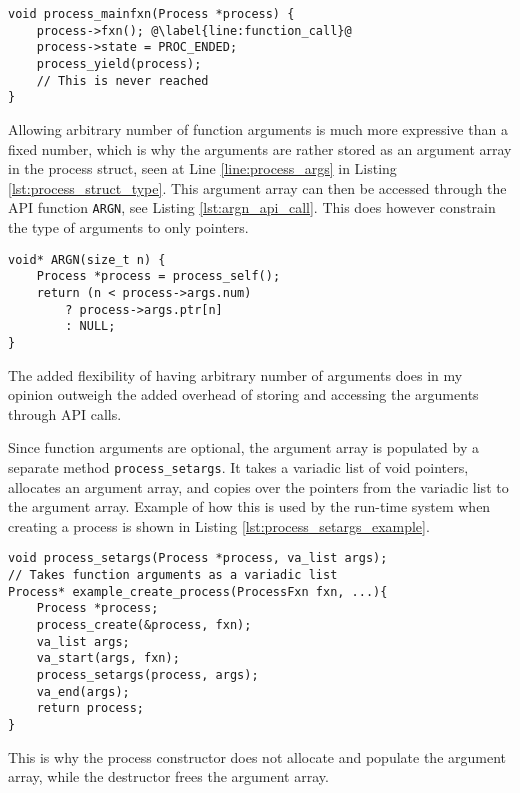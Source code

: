 \begin{lstlisting}[style={CustomC},caption={Process main function},label={lst:process_main_function}]
void process_mainfxn(Process *process) {
    process->fxn(); @\label{line:function_call}@
    process->state = PROC_ENDED;
    process_yield(process);
    // This is never reached
}
\end{lstlisting}

Allowing arbitrary number of function arguments is much more expressive than a fixed number, which is why the arguments are rather stored as an argument array in the process struct, seen at Line \ref{line:process_args} in Listing \ref{lst:process_struct_type}. This argument array can then be accessed through the API function \texttt{ARGN}, see Listing \ref{lst:argn_api_call}. This does however constrain the type of arguments to only pointers. 

\begin{lstlisting}[style={CustomC},caption={\texttt{ARGN} API function},label={lst:argn_api_call}]
void* ARGN(size_t n) {
    Process *process = process_self();
    return (n < process->args.num)
        ? process->args.ptr[n]
        : NULL;
}
\end{lstlisting}

The added flexibility of having arbitrary number of arguments does in my opinion outweigh the added overhead of storing and accessing the arguments through API calls.

Since function arguments are optional, the argument array is populated by a separate meth\-od \texttt{process\_setargs}. It takes a variadic list of void pointers, allocates an argument array, and copies over the pointers from the variadic list to the argument array. Example of how this is used by the run\hyp{}time system when creating a process is shown in Listing \ref{lst:process_setargs_example}.

\begin{lstlisting}[style={CustomC},caption={Process creation example example},label={lst:process_setargs_example}]
void process_setargs(Process *process, va_list args);
// Takes function arguments as a variadic list 
Process* example_create_process(ProcessFxn fxn, ...){
    Process *process;
    process_create(&process, fxn);
    va_list args;
    va_start(args, fxn);
    process_setargs(process, args);
    va_end(args);
    return process;
}
\end{lstlisting}

This is why the process constructor does not allocate and populate the argument array, while the destructor frees the argument array. 

